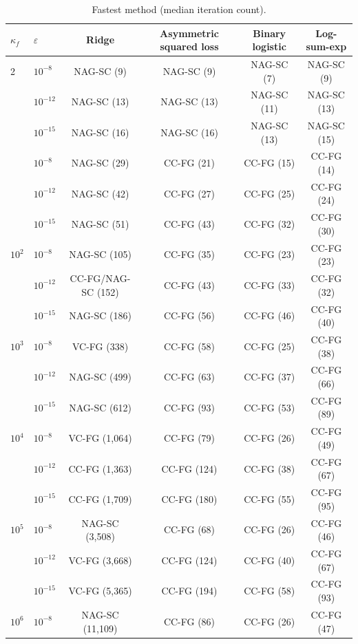 \begin{table}[H]
\centering\small
\caption{Fastest method (median iteration count).}
\label{tab:winners}
\footnotesize
\setlength{\tabcolsep}{3.2pt}
\begin{tabular}{@{}llcccc@{}}
\toprule
$\kappa_f$ & $\varepsilon$ & Ridge & Asymmetric squared loss & Binary logistic & Log-sum-exp \\
\midrule
2 & $10^{-8}$ & NAG-SC (9) & NAG-SC (9) & NAG-SC (7) & NAG-SC (9) \\
 & $10^{-12}$ & NAG-SC (13) & NAG-SC (13) & NAG-SC (11) & NAG-SC (13) \\
 & $10^{-15}$ & NAG-SC (16) & NAG-SC (16) & NAG-SC (13) & NAG-SC (15) \\
\addlinespace[2pt]
10 & $10^{-8}$ & NAG-SC (29) & CC-FG (21) & CC-FG (15) & CC-FG (14) \\
 & $10^{-12}$ & NAG-SC (42) & CC-FG (27) & CC-FG (25) & CC-FG (24) \\
 & $10^{-15}$ & NAG-SC (51) & CC-FG (43) & CC-FG (32) & CC-FG (30) \\
\addlinespace[2pt]
$10^{2}$ & $10^{-8}$ & NAG-SC (105) & CC-FG (35) & CC-FG (23) & CC-FG (23) \\
 & $10^{-12}$ & CC-FG/NAG-SC (152) & CC-FG (43) & CC-FG (33) & CC-FG (32) \\
 & $10^{-15}$ & NAG-SC (186) & CC-FG (56) & CC-FG (46) & CC-FG (40) \\
\addlinespace[2pt]
$10^{3}$ & $10^{-8}$ & VC-FG (338) & CC-FG (58) & CC-FG (25) & CC-FG (38) \\
 & $10^{-12}$ & NAG-SC (499) & CC-FG (63) & CC-FG (37) & CC-FG (66) \\
 & $10^{-15}$ & NAG-SC (612) & CC-FG (93) & CC-FG (53) & CC-FG (89) \\
\addlinespace[2pt]
$10^{4}$ & $10^{-8}$ & VC-FG (1,064) & CC-FG (79) & CC-FG (26) & CC-FG (49) \\
 & $10^{-12}$ & CC-FG (1,363) & CC-FG (124) & CC-FG (38) & CC-FG (67) \\
 & $10^{-15}$ & CC-FG (1,709) & CC-FG (180) & CC-FG (55) & CC-FG (95) \\
\addlinespace[2pt]
$10^{5}$ & $10^{-8}$ & NAG-SC (3,508) & CC-FG (68) & CC-FG (26) & CC-FG (46) \\
 & $10^{-12}$ & VC-FG (3,668) & CC-FG (124) & CC-FG (40) & CC-FG (67) \\
 & $10^{-15}$ & VC-FG (5,365) & CC-FG (194) & CC-FG (58) & CC-FG (93) \\
\addlinespace[2pt]
$10^{6}$ & $10^{-8}$ & NAG-SC (11,109) & CC-FG (86) & CC-FG (26) & CC-FG (47) \\

\end{tabular}
\end{table}
